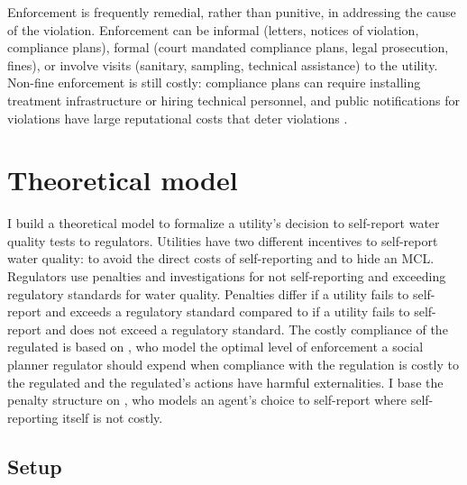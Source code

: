 \documentclass[12pt]{article}
\begin{document}
Enforcement is frequently remedial, rather than punitive, in addressing the cause of the violation. Enforcement can be informal (letters, notices of violation, compliance plans), formal (court mandated compliance plans, legal prosecution, fines), or involve visits (sanitary, sampling, technical assistance) to the utility. Non-fine enforcement is still costly: compliance plans can require installing treatment infrastructure or hiring technical personnel, and public notifications for violations have large reputational costs that deter violations \parencite{bennear2008impacts}.

\section{Theoretical model}

I build a theoretical model to formalize a utility's decision to self-report water quality tests to regulators. Utilities have two different incentives to self-report water quality: to avoid the direct costs of self-reporting and to hide an MCL. Regulators use penalties and investigations for not self-reporting and exceeding regulatory standards for water quality. Penalties differ if a utility fails to self-report and exceeds a regulatory standard compared to if a utility fails to self-report and does not exceed a regulatory standard. The costly compliance of the regulated is based on \textcite{mookherjee1994marginal}, who model the optimal level of enforcement a social planner regulator should expend when compliance with the regulation is costly to the regulated and the regulated's actions have harmful externalities. I base the penalty structure on \textcite{kaplow1994optimal}, who models an agent's choice to self-report where self-reporting itself is not costly. 

\subsection{Setup}
\end{document}
